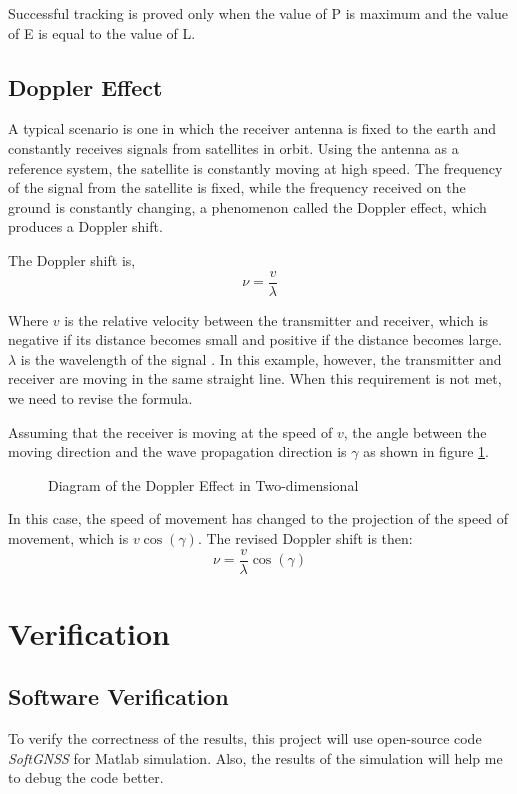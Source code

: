 Successful tracking is proved only when the value of P is maximum and the value of E is equal to the value of L.

\subsection{Doppler Effect}
A typical scenario is one in which the receiver antenna is fixed to the earth and constantly receives signals from satellites in orbit. Using the antenna as a reference system, the satellite is constantly moving at high speed. The frequency of the signal from the satellite is fixed, while the frequency received on the ground is constantly changing, a phenomenon called the Doppler effect, which produces a Doppler shift.

The Doppler shift is,
\begin{equation}
    \nu =\frac{v}{\lambda}
\end{equation}

Where $v$ is the relative velocity between the transmitter and receiver, which is negative if its distance becomes small and positive if the distance becomes large. $\lambda$ is the wavelength of the signal \cite{RN203}. In this example, however, the transmitter and receiver are moving in the same straight line. When this requirement is not met, we need to revise the formula.

Assuming that the receiver is moving at the speed of $v$, the angle between the moving direction and the wave propagation direction is $\gamma$ as shown in figure \ref{fig:doppler}.

\begin{figure}[!htbp]
    \centering
    
    \caption{Diagram of the Doppler Effect in Two-dimensional}
    \label{fig:doppler}
\end{figure}

In this case, the speed of movement has changed to the projection of the speed of movement, which is $v\cos(\gamma)$. The revised Doppler shift is then:
\begin{equation}
    \nu =\frac{v}{\lambda}\cos(\gamma)
\end{equation}

\section{Verification}
\subsection{Software Verification}
To verify the correctness of the results, this project will use open-source code \textit{SoftGNSS} for Matlab simulation. Also, the results of the simulation will help me to debug the code better.

